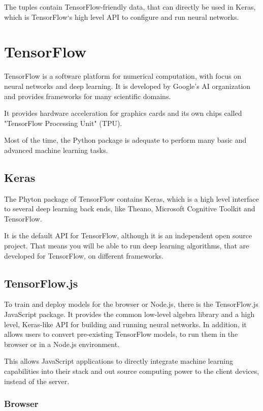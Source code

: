 \documentclass[11pt]{article}
\begin{document}
The tuples contain TensorFlow-friendly data, that can directly be used in Keras, which is TensorFlow`s high level API to configure and run neural networks.

\section{TensorFlow}

TensorFlow is a software platform for numerical computation, with focus on neural networks and deep learning.
It is developed by Google's AI organization and provides frameworks for many scientific domains.

It provides hardware acceleration for graphics cards and its own chips called "TensorFlow Processing Unit" (TPU).

Most of the time, the Python package is adequate to perform many basic and advanced machine learning tasks.

\subsection{Keras}

The Phyton package of TensorFlow contains Keras, which is a high level interface to several deep learning back ends, like Theano, Microsoft Cognitive Toolkit and TensorFlow.

It is the default API for TensorFlow, although it is an independent open source project.
That means you will be able to run deep learning algorithms, that are developed for TensorFlow, on different frameworks.

\subsection{TensorFlow.js}

To train and deploy models for the browser or Node.js, there is the TensorFlow.js JavaScript package.
It provides the common low-level algebra library and a high level, Keras-like API for building and running neural networks.
In addition, it allows users to convert pre-existing TensorFlow models, to run them in the browser or in a Node.js environment.

This allows JavaScript applications to directly integrate machine learning capabilities into their stack and out source computing power to the client devices, instead of the server.

\subsubsection{Browser}
\end{document}
